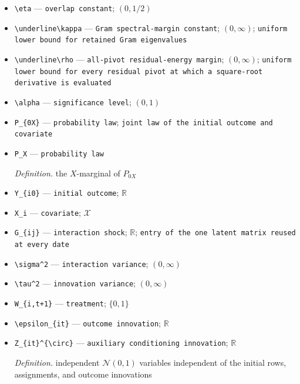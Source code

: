 \documentclass{article}
\begin{document}
\begin{itemize}
  \item \texttt{\textbackslash{}\allowbreak{}eta} --- \texttt{overlap constant}; \((0,1/2)\)
  \item \texttt{\textbackslash{}\allowbreak{}underline\textbackslash{}\allowbreak{}kappa} --- \texttt{Gram spectral-\allowbreak{}margin constant}; \((0,\infty)\); \texttt{uniform lower bound for retained Gram eigenvalues}
  \item \texttt{\textbackslash{}\allowbreak{}underline\textbackslash{}\allowbreak{}rho} --- \texttt{all-\allowbreak{}pivot residual-\allowbreak{}energy margin}; \((0,\infty)\); \texttt{uniform lower bound for every residual pivot at which a square-\allowbreak{}root derivative is evaluated}
  \item \texttt{\textbackslash{}\allowbreak{}alpha} --- \texttt{significance level}; \((0,1)\)
  \item \texttt{P\_\allowbreak{}\{0X\}\allowbreak{}} --- \texttt{probability law}; \texttt{joint law of the initial outcome and covariate}
  \item \texttt{P\_\allowbreak{}X} --- \texttt{probability law}
  \par\smallskip\noindent\emph{Definition.} the \(X\)-marginal of \(P_{0X}\)
  \item \texttt{Y\_\allowbreak{}\{i0\}\allowbreak{}} --- \texttt{initial outcome}; \(\mathbb R\)
  \item \texttt{X\_\allowbreak{}i} --- \texttt{covariate}; \(\mathcal X\)
  \item \texttt{G\_\allowbreak{}\{ij\}\allowbreak{}} --- \texttt{interaction shock}; \(\mathbb R\); \texttt{entry of the one latent matrix reused at every date}
  \item \texttt{\textbackslash{}\allowbreak{}sigma\textasciicircum{}2} --- \texttt{interaction variance}; \((0,\infty)\)
  \item \texttt{\textbackslash{}\allowbreak{}tau\textasciicircum{}2} --- \texttt{innovation variance}; \((0,\infty)\)
  \item \texttt{W\_\allowbreak{}\{i,\allowbreak{}t+\allowbreak{}1\}\allowbreak{}} --- \texttt{treatment}; \(\{0,1\}\)
  \item \texttt{\textbackslash{}\allowbreak{}epsilon\_\allowbreak{}\{it\}\allowbreak{}} --- \texttt{outcome innovation}; \(\mathbb R\)
  \item \texttt{Z\_\allowbreak{}\{it\}\allowbreak{}\textasciicircum{}\{\textbackslash{}\allowbreak{}circ\}\allowbreak{}} --- \texttt{auxiliary conditioning innovation}; \(\mathbb R\)
  \par\smallskip\noindent\emph{Definition.} independent \(\mathcal N(0,1)\) variables independent of the initial rows, assignments, and outcome innovations

\end{itemize}
\end{document}
